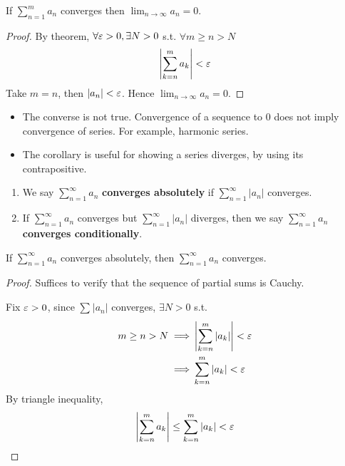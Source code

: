 \begin{corollary}
    If $\sum\limits_{n = 1}^{m} a_n$ converges
    then $\lim_{n \to \infty}a_n = 0$.
\end{corollary}

\begin{proof}
    By theorem, $\forall \varepsilon > 0, \exists N > 0$ s.t. 
    $\forall m \geq n > N$
    \[
        \left| \sum\limits_{k=n}^{m} a_k  \right|  < \varepsilon
    \]
    Take $m = n$, then $ \left| a_n  \right| < \varepsilon$. 
    Hence $\lim_{n \to \infty}a_n = 0$.
\end{proof}

\begin{remark}
    \begin{itemize}
        \item The converse is not true. Convergence of a sequence
        to 0 does not imply convergence of series. For example, 
        harmonic series.
        \item The corollary is useful for showing a series diverges,
        by using its contrapositive.
    \end{itemize} 
\end{remark}

\begin{definition}
    \hfill
    \begin{enumerate}
        \item We say $\sum\limits_{n = 1}^{\infty} a_n$ \textbf{converges
        absolutely} if $ \sum\limits_{n = 1}^{\infty} |a_n| $ converges.
        \item If $\sum\limits_{n=1}^{\infty} a_n$ converges 
        but $ \sum\limits_{n = 1}^{\infty} |a_n|$ diverges, then we say 
        $\sum\limits_{n = 1}^{\infty} a_n$ \textbf{converges conditionally}.
    \end{enumerate} 
\end{definition}

\begin{corollary}
    If $\sum\limits_{n = 1}^{\infty} a_n$ converges absolutely, 
    then $\sum\limits_{n = 1}^{\infty} a_n$ converges.
\end{corollary}

\begin{proof}
    Suffices to verify that the sequence of partial sums 
    is Cauchy. 
    \medskip

    Fix $\varepsilon > 0$, since $\sum\limits_{}^{} |a_n|$ converges,
    $\exists N > 0$ s.t.
    \begin{align*}
        m \geq n > N 
        \implies &
        \left| \sum\limits_{k=n}^{m}|a_k|  \right|  < \varepsilon \\
        \implies & \sum\limits_{k = n}^{m} |a_k| < \varepsilon 
    \end{align*}
    By triangle inequality,
    \[
    \left| \sum\limits_{k = n}^{m} a_k \right|  
    \leq 
    \sum\limits_{k = n}^{m}  \left| a_k \right| 
    < \varepsilon
    \]
\end{proof}

